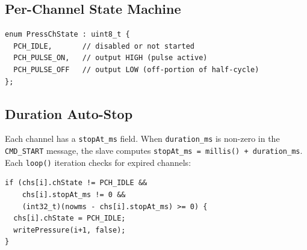 \documentclass[11pt,a4paper]{article}
\begin{document}
\subsection{Per-Channel State Machine}

\begin{center}
\end{center}

\begin{lstlisting}[style=cppstyle, caption={Pressure channel state enum}]
enum PressChState : uint8_t {
  PCH_IDLE,       // disabled or not started
  PCH_PULSE_ON,   // output HIGH (pulse active)
  PCH_PULSE_OFF   // output LOW (off-portion of half-cycle)
};
\end{lstlisting}

\subsection{Duration Auto-Stop}

Each channel has a \texttt{stopAt\_ms} field. When \texttt{duration\_ms} is
non-zero in the \texttt{CMD\_START} message, the slave computes
\texttt{stopAt\_ms = millis() + duration\_ms}. Each \texttt{loop()} iteration
checks for expired channels:

\begin{lstlisting}[style=cppstyle]
if (chs[i].chState != PCH_IDLE &&
    chs[i].stopAt_ms != 0 &&
    (int32_t)(nowms - chs[i].stopAt_ms) >= 0) {
  chs[i].chState = PCH_IDLE;
  writePressure(i+1, false);
}
\end{lstlisting}
\end{document}
